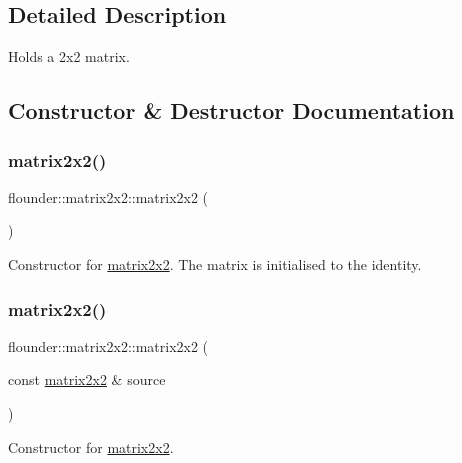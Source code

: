 \subsection{Detailed Description}
Holds a 2x2 matrix. 



\subsection{Constructor \& Destructor Documentation}
\mbox{\label{classflounder_1_1matrix2x2_a36cfba47f3343e46a6718fb2114a31ad}} 
\subsubsection{\texorpdfstring{matrix2x2()}{matrix2x2()}\hspace{0.1cm}{\footnotesize\ttfamily [1/3]}}
{\footnotesize\ttfamily flounder\+::matrix2x2\+::matrix2x2 (\begin{DoxyParamCaption}{ }\end{DoxyParamCaption})}



Constructor for \hyperlink{classflounder_1_1matrix2x2}{matrix2x2}. The matrix is initialised to the identity. 

\mbox{\label{classflounder_1_1matrix2x2_aed6637e2cdad9192621cae7a2e7b4ba2}} 
\subsubsection{\texorpdfstring{matrix2x2()}{matrix2x2()}\hspace{0.1cm}{\footnotesize\ttfamily [2/3]}}
{\footnotesize\ttfamily flounder\+::matrix2x2\+::matrix2x2 (\begin{DoxyParamCaption}\item[{const \hyperlink{classflounder_1_1matrix2x2}{matrix2x2} \&}]{source }\end{DoxyParamCaption})}



Constructor for \hyperlink{classflounder_1_1matrix2x2}{matrix2x2}. 


